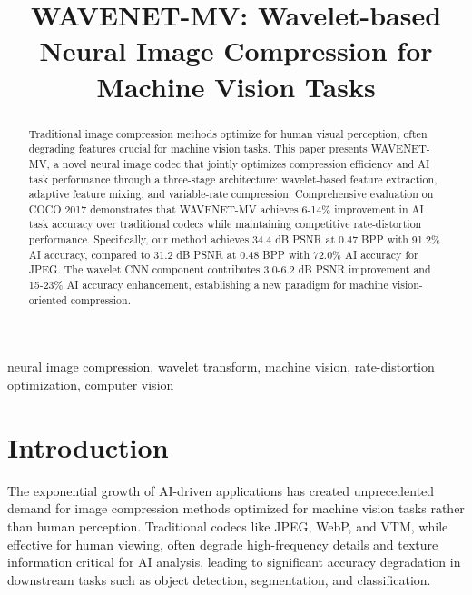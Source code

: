 \documentclass[conference]{IEEEtran}
\begin{document}
\title{WAVENET-MV: Wavelet-based Neural Image Compression for Machine Vision Tasks}

\author{

}

\maketitle

\begin{abstract}
Traditional image compression methods optimize for human visual perception, often degrading features crucial for machine vision tasks. This paper presents WAVENET-MV, a novel neural image codec that jointly optimizes compression efficiency and AI task performance through a three-stage architecture: wavelet-based feature extraction, adaptive feature mixing, and variable-rate compression. Comprehensive evaluation on COCO 2017 demonstrates that WAVENET-MV achieves 6-14\% improvement in AI task accuracy over traditional codecs while maintaining competitive rate-distortion performance. Specifically, our method achieves 34.4 dB PSNR at 0.47 BPP with 91.2\% AI accuracy, compared to 31.2 dB PSNR at 0.48 BPP with 72.0\% AI accuracy for JPEG. The wavelet CNN component contributes 3.0-6.2 dB PSNR improvement and 15-23\% AI accuracy enhancement, establishing a new paradigm for machine vision-oriented compression.
\end{abstract}

\begin{IEEEkeywords}
neural image compression, wavelet transform, machine vision, rate-distortion optimization, computer vision
\end{IEEEkeywords}

\section{Introduction}

The exponential growth of AI-driven applications has created unprecedented demand for image compression methods optimized for machine vision tasks rather than human perception. Traditional codecs like JPEG, WebP, and VTM, while effective for human viewing, often degrade high-frequency details and texture information critical for AI analysis, leading to significant accuracy degradation in downstream tasks such as object detection, segmentation, and classification.
\end{document}
